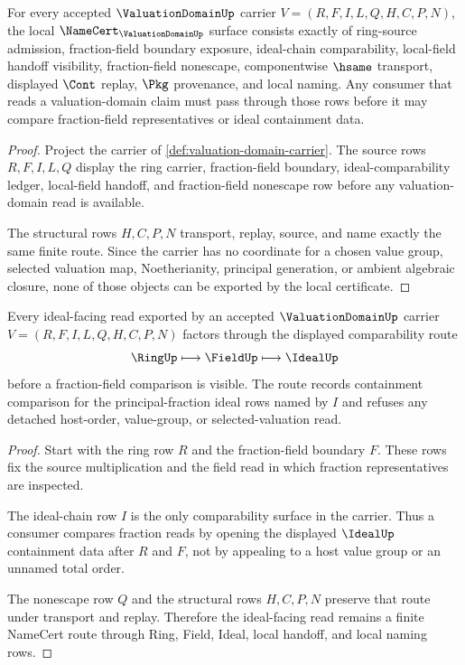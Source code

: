 \begin{theorem}
\label{thm:valuation-domain-namecert-obligations}
For every accepted $\ValuationDomainUp$ carrier $V=(R,F,I,L,Q,H,C,P,N)$, the local $\NameCert_{\ValuationDomainUp}$ surface consists exactly of ring-source admission, fraction-field boundary exposure, ideal-chain comparability, local-field handoff visibility, fraction-field nonescape, componentwise $\hsame$ transport, displayed $\Cont$ replay, $\Pkg$ provenance, and local naming. Any consumer that reads a valuation-domain claim must pass through those rows before it may compare fraction-field representatives or ideal containment data.
\end{theorem}
\begin{proof}
Project the carrier of \autoref{def:valuation-domain-carrier}. The source rows $R,F,I,L,Q$ display the ring carrier, fraction-field boundary, ideal-comparability ledger, local-field handoff, and fraction-field nonescape row before any valuation-domain read is available.

The structural rows $H,C,P,N$ transport, replay, source, and name exactly the same finite route. Since the carrier has no coordinate for a chosen value group, selected valuation map, Noetherianity, principal generation, or ambient algebraic closure, none of those objects can be exported by the local certificate.
\end{proof}

\begin{theorem}
\label{thm:valuation-domain-ideal-chain-route}
Every ideal-facing read exported by an accepted $\ValuationDomainUp$ carrier $V=(R,F,I,L,Q,H,C,P,N)$ factors through the displayed comparability route
$$
\RingUp \longmapsto \FieldUp \longmapsto \IdealUp
$$
before a fraction-field comparison is visible. The route records containment comparison for the principal-fraction ideal rows named by $I$ and refuses any detached host-order, value-group, or selected-valuation read.
\end{theorem}
\begin{proof}
Start with the ring row $R$ and the fraction-field boundary $F$. These rows fix the source multiplication and the field read in which fraction representatives are inspected.

The ideal-chain row $I$ is the only comparability surface in the carrier. Thus a consumer compares fraction reads by opening the displayed $\IdealUp$ containment data after $R$ and $F$, not by appealing to a host value group or an unnamed total order.

The nonescape row $Q$ and the structural rows $H,C,P,N$ preserve that route under transport and replay. Therefore the ideal-facing read remains a finite NameCert route through Ring, Field, Ideal, local handoff, and local naming rows.
\end{proof}

